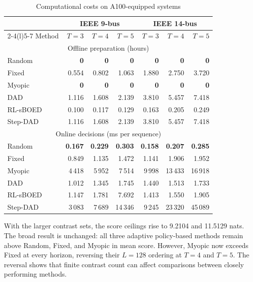 \documentclass[conference,letterpaper]{IEEEtran}
\begin{document}
\begin{table}[!t]
\begin{minipage}[t]{0.49\textwidth}
\end{minipage}
\hfill
\begin{minipage}[t]{0.49\textwidth}
\caption{Computational costs on A100-equipped systems}
\label{tab:cost}
\centering\scriptsize\setlength{\tabcolsep}{2.0pt}\renewcommand{\arraystretch}{1.02}
\begin{tabular*}{\linewidth}{@{\extracolsep{\fill}}lrrrrrr@{}}
\toprule
& \multicolumn{3}{c}{IEEE 9-bus} & \multicolumn{3}{c}{IEEE 14-bus}\\
\cmidrule(lr){2-4}\cmidrule(l){5-7}
Method & $T=3$ & $T=4$ & $T=5$ & $T=3$ & $T=4$ & $T=5$\\
\midrule\multicolumn{7}{c}{Offline preparation (hours)}\\\midrule
Random & \textbf{0} & \textbf{0} & \textbf{0} & \textbf{0} & \textbf{0} & \textbf{0}\\
Fixed & 0.554 & 0.802 & 1.063 & 1.880 & 2.750 & 3.720\\
Myopic & \textbf{0} & \textbf{0} & \textbf{0} & \textbf{0} & \textbf{0} & \textbf{0}\\
DAD & 1.116 & 1.608 & 2.139 & 3.810 & 5.457 & 7.418\\
RL-sBOED & 0.100 & 0.117 & 0.129 & 0.163 & 0.205 & 0.249\\
Step-DAD & 1.116 & 1.608 & 2.139 & 3.810 & 5.457 & 7.418\\
\midrule\multicolumn{7}{c}{Online decisions (ms per sequence)}\\\midrule
Random & \textbf{0.167} & \textbf{0.229} & \textbf{0.303} & \textbf{0.158} & \textbf{0.207} & \textbf{0.285}\\
Fixed & 0.849 & 1.135 & 1.472 & 1.141 & 1.906 & 1.952\\
Myopic & 4\,418 & 5\,952 & 7\,514 & 9\,998 & 13\,433 & 16\,918\\
DAD & 1.012 & 1.345 & 1.745 & 1.440 & 1.513 & 1.733\\
RL-sBOED & 1.147 & 1.781 & 7.692 & 1.413 & 1.550 & 1.905\\
Step-DAD & 3\,083 & 7\,689 & 14\,346 & 9\,245 & 23\,320 & 45\,089\\
\bottomrule\end{tabular*}
\end{minipage}
\end{table}

With the larger contrast sets, the score ceilings rise to 9.2104 and 11.5129 nats. The broad result is unchanged: all three adaptive policy-based methods remain above Random, Fixed, and Myopic in mean score. However, Myopic now exceeds Fixed at every horizon, reversing their $L=128$ ordering at $T=4$ and $T=5$. The reversal shows that finite contrast count can affect comparisons between closely performing methods.
\end{document}
